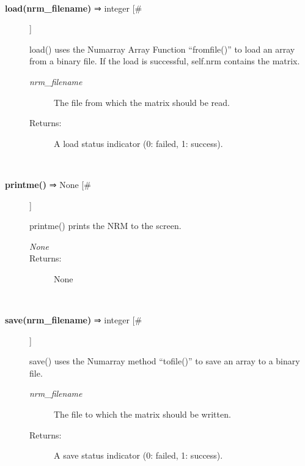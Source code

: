 \documentclass[10pt]{article}
\begin{document}
\begin{description}
\begin{description}
\end{description}
\\ 

\item[\textbf{load(nrm\_filename)}
 ⇒ integer [\#]]

 load() uses the Numarray Array Function ``fromfile()'' to load an array from a binary file. If the load is successful, self.nrm contains the matrix.
\begin{description}
\item[\emph{nrm\_filename}
] The file from which the matrix should be read.
\item[Returns:] A load status indicator (0: failed, 1: success).

\end{description}
\\ 

\item[\textbf{printme()}
 ⇒ None [\#]]

 printme() prints the NRM to the screen.
\begin{description}
\item[\emph{None}
]
\item[Returns:] None

\end{description}
\\ 

\item[\textbf{save(nrm\_filename)}
 ⇒ integer [\#]]

 save() uses the Numarray method ``tofile()'' to save an array to a binary file.
\begin{description}
\item[\emph{nrm\_filename}
] The file to which the matrix should be written.
\item[Returns:] A save status indicator (0: failed, 1: success).

\end{description}
\\ 


\end{description}
\end{document}
